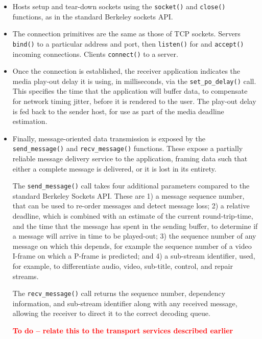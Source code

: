 \documentclass{sig-alternate-05-2015}
\newcommand{\todo}[1]{\textbf{\textcolor{red}{To do -- #1}}}
\begin{document}
\begin{itemize}
  \item Hosts setup and tear-down sockets using the \texttt{socket()}
    and \texttt{close()} functions, as in the standard Berkeley sockets
    API. 

  \item The connection primitives are the same as those of TCP sockets.
    Servers \texttt{bind()} to a particular address and port, then
    \texttt{listen()} for and \texttt{accept()} incoming connections.
    Clients \texttt{connect()} to a server.

   \item Once the connection is established, the receiver application
     indicates the media play-out delay it is using, in milliseconds, via
     the \texttt{set\_po\_delay()} call. This specifies the time that the
     application will buffer data, to compensate for network timing jitter,
     before it is rendered to the user. The play-out delay is fed back to
     the sender host, for use as part of the media deadline estimation. 
    
  \item Finally, message-oriented data transmission is exposed by the
    \texttt{send\_message()} and \texttt{recv\_message()} functions.  
    These expose a partially reliable message delivery service to the
    application, framing data such that either a complete message is
    delivered, or it is lost in its entirety. 

    The \texttt{send\_message()} call takes four additional parameters
    compared to the standard Berkeley Sockets API. These are 1) a message
    sequence number, that can be used to re-order messages and detect 
    message loss; 2) a relative deadline, which is combined with an
    estimate of the current round-trip-time, and the time that the message
    has spent in the sending buffer, to determine if a message will arrive
    in time to be played-out; 3) the sequence number of any message on
    which this depends, for example the sequence number of a video I-frame
    on which a P-frame is predicted; and 4) a sub-stream identifier, used,
    for example, to differentiate audio, video, sub-title, control, and
    repair streams.

    The \texttt{recv\_message()} call returns the sequence number,
    dependency information, and sub-stream identifier along with any
    received message, allowing the receiver to direct it to the correct
    decoding queue. 

    \todo{relate this to the transport services described earlier}

\end{itemize}
\end{document}
